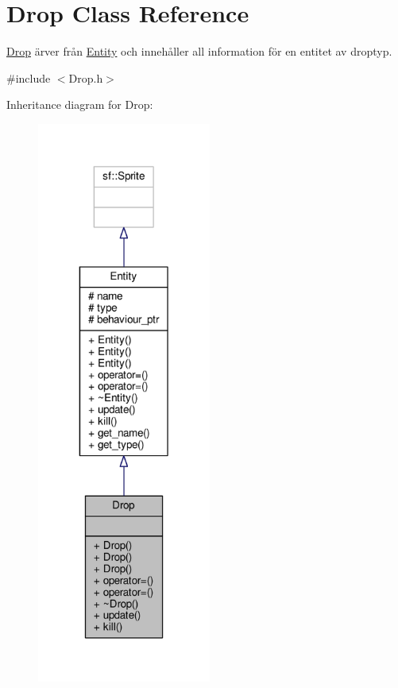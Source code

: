 \hypertarget{classDrop}{\section{Drop Class Reference}
\label{classDrop}
}


\hyperlink{classDrop}{Drop} ärver från \hyperlink{classEntity}{Entity} och innehåller all information för en entitet av droptyp.  




{\ttfamily \#include $<$Drop.\+h$>$}



Inheritance diagram for Drop\+:\nopagebreak
\begin{figure}[H]
\begin{center}
\leavevmode
\includegraphics[width=162pt]{classDrop__inherit__graph}
\end{center}
\end{figure}


